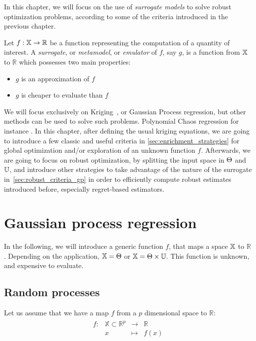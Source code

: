 \documentclass[../../Main_ManuscritThese.tex]{subfiles}
\begin{document}
 In this chapter, we will focus on the use of \emph{surrogate models} to solve robust optimization problems, according to some of the criteria introduced in the previous chapter.
\begin{definition}
  Let $f: \mathbb{X} \rightarrow \mathbb{R}$ be a function representing the computation of a quantity of interest. A \emph{surrogate}, or \emph{metamodel}, or \emph{emulator} of $f$, say $g$, is a function from $\mathbb{X}$ to $\mathbb{R}$ which possesses two main properties:
  \begin{itemize}
  \item $g$ is an approximation of $f$
  \item $g$ is cheaper to evaluate than $f$ 
  \end{itemize}
\end{definition}
We will focus exclusively on Kriging~\cite{krige_statistical_1951,matheron_traite_1962}, or Gaussian Process regression, but other methods can be used to solve such problems. Polynomial Chaos regression for instance \cite{wiener_homogeneous_1938,xiu_wiener--askey_2002,sudret_polynomial_2015,miranda_adjoint-based_2016}. %
In this chapter, after defining the usual kriging equations, we are going to introduce a few classic and useful criteria in \cref{sec:enrichment_strategies} for global optimization and/or exploration of an unknown function $f$. Afterwards, we are going to focus on robust optimization, by splitting the input space in $\Theta$ and $\mathbb{U}$, and introduce other strategies to take advantage of the nature of the surrogate in~\cref{sec:robust_criteria_gp} in order to efficiently compute robust estimates introduced before, especially regret-based estimators.

\section{Gaussian process regression}
In the following, we will introduce a generic function $f$, that maps a space $\mathbb{X}$ to $\mathbb{R}$. Depending on the application, $\mathbb{X} = \Theta$ or $\mathbb{X} = \Theta \times \mathbb{U}$. This function is unknown, and  expensive to evaluate.

\subsection{Random processes}
Let us assume that we have a map $f$ from a $p$ dimensional space to $\mathbb{R}$:
\begin{align}
  \begin{array}{rrcl}
    f: & \mathbb{X} \subset \mathbb{R}^p& \longrightarrow & \mathbb{R} \\
       & x & \longmapsto & f(x)
  \end{array}
\end{align}
\end{document}
